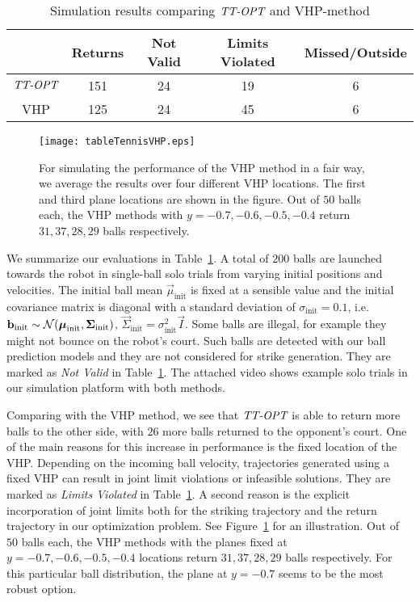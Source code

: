 \begin{table}
\renewcommand{\arraystretch}{1.3}
\caption{Simulation results comparing $\emph{TT-OPT}$ and VHP-method}
\label{tableSimResults}
\centering
\begin{tabular}{c||c|c|c|c}
& \bfseries Returns & \bfseries Not Valid  & \bfseries Limits Violated & \bfseries Missed/Outside \\
\hline
$\emph{TT-OPT}$ & 151 & 24 & 19 & 6\\
\hline
VHP & 125 & 24 & 45 & 6\\
\hline
\end{tabular}
\end{table}
%
\begin{figure}[t!]
\centering
\texttt{[image: tableTennisVHP.eps]}			
\caption{For simulating the performance of the VHP method in a fair way, we average the results over four different VHP locations. The first and third plane locations are shown in the figure. Out of $50$ balls each, the VHP methods with $y = -0.7,-0.6,-0.5,-0.4$ return $31, 37, 28, 29$ balls respectively.}
\label{vhps}
\end{figure}
%
We summarize our evaluations in Table~\ref{tableSimResults}. A total of $200$ balls are launched towards the robot in single-ball solo trials from varying initial positions and velocities. The initial ball mean $\vec{\mu}_{\mathrm{init}}$ is fixed at a sensible value and the initial covariance matrix is diagonal with a standard deviation of $\sigma_{\mathrm{init}} = 0.1$, i.e. $\boldsymbol{\mathrm{b}}_{\mathrm{init}} \sim \mathcal{N}(\boldsymbol{\mathrm{\mu}}_{\mathrm{init}}, \boldsymbol{\mathrm{\Sigma}}_{\mathrm{init}})$, $\vec{\Sigma}_{\mathrm{init}} = \sigma_{\mathrm{init}}^2 \vec{I}$. Some balls are illegal, for example they might not bounce on the robot's court. Such balls are detected with our ball prediction models and they are not considered for strike generation. They are marked as \emph{Not Valid} in Table~\ref{tableSimResults}. The attached video shows example solo trials in our simulation platform with both methods.

Comparing with the VHP method, we see that $\emph{TT-OPT}$ is able to return more balls to the other side, with $26$ more balls returned to the opponent's court. One of the main reasons for this increase in performance is the fixed location of the VHP. Depending on the incoming ball velocity, trajectories generated using a fixed VHP can result in joint limit violations or infeasible solutions. They are marked as \emph{Limits Violated} in Table~\ref{tableSimResults}. A second reason is the explicit incorporation of joint limits both for the striking trajectory and the return trajectory in our optimization problem. See Figure~\ref{vhps} for an illustration. Out of $50$ balls each, the VHP methods with the planes fixed at $y = -0.7,-0.6,-0.5,-0.4$ locations return $31, 37, 28, 29$ balls respectively. For this particular ball distribution, the plane at $y = -0.7$ seems to be the most robust option.

